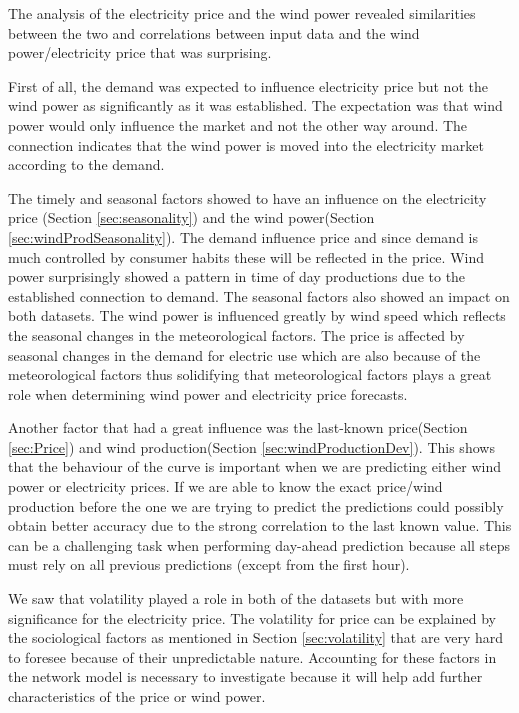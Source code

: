 The analysis of the electricity price and the wind power revealed similarities between the two and correlations between input data and the wind power/electricity price that was surprising.

First of all, the demand was expected to influence electricity price but not the wind power as significantly as it was established. The expectation was that wind power would only influence the market and not the other way around. The connection indicates that the wind power is moved into the electricity market according to the demand.

The timely and seasonal factors showed to have an influence on the electricity price (Section \ref{sec:seasonality}) and the wind power(Section \ref{sec:windProdSeasonality}). The demand influence price and since demand is much controlled by consumer habits these will be reflected in the price. Wind power surprisingly showed a pattern in time of day productions due to the established connection to demand. The seasonal factors also showed an impact on both datasets. The wind power is influenced greatly by wind speed which reflects the seasonal changes in the meteorological factors. The price is affected by seasonal changes in the demand for electric use which are also because of the meteorological factors thus solidifying that meteorological factors plays a great role when determining wind power and electricity price forecasts.

Another factor that had a great influence was the last-known price(Section \ref{sec:Price}) and wind production(Section \ref{sec:windProductionDev}). This shows that the behaviour of the curve is important when we are predicting either wind power or electricity prices. If we are able to know the exact price/wind production before the one we are trying to predict the predictions could possibly obtain better accuracy due to the strong correlation to the last known value. This can be a challenging task when performing day-ahead prediction because all steps must rely on all previous predictions (except from the first hour). 

We saw that volatility played a role in both of the datasets but with more significance for the electricity price. The volatility for price can be explained by the sociological factors as mentioned in Section \ref{sec:volatility} that are very hard to foresee because of their unpredictable nature. Accounting for these factors in the network model is necessary to investigate because it will help add further characteristics of the price or wind power.

